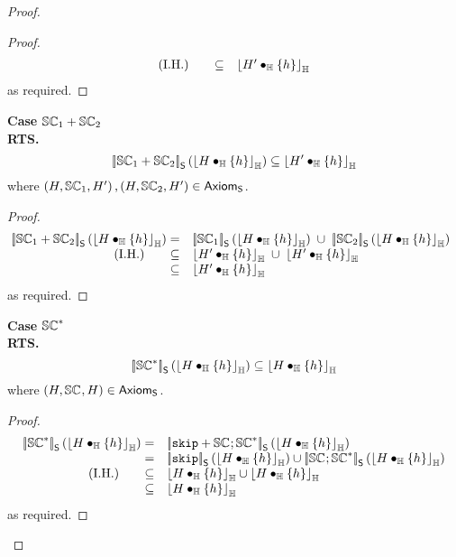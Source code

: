 \begin{lemma}
\begin{proof}
\begin{proof}
\[\begin{array}{r l}
	\text{(I.H.) \hspace*{0.5cm}}
	\subseteq &
	\left\lfloor H' \bullet_{\mathbb{H}} \{h\} \right\rfloor_{\mathbb{H}}
	
\end{array}
\]
%
as required.
\renewcommand{\qed}{}
\end{proof}
%
%

\noindent\textbf{Case \hspace*{0.3cm}}$\mathbb{SC}_{1} + \mathbb{SC}_{2}$\\
\textbf{RTS.}
%
\[
	\left[\!\left| \mathbb{SC}_{1} + \mathbb{SC}_{2} \right |\! \right]_{\textsf{S}}\left( \left\lfloor H \bullet_{\mathbb{H}} \{h\} \right\rfloor_{\mathbb{H}} \right) 
	\subseteq \left\lfloor H' \bullet_{\mathbb{H}} \{h\} \right\rfloor_{\mathbb{H}}
\]
%
where $\left(H, \mathbb{SC}_{1}, H' \right), \left(H, \mathbb{SC}_{2}, H' \right)  \in \textsf{Axiom}_{\textsf{S}}$.
\begin{proof}
%
\[
\hspace*{-0.2cm}
\begin{array}{r l}
	
	\opSemSeq{\seq{1} + \seq{2}}{\reifyH{H \composeH \{h\}}} 
	= &  
	\opSemSeq{\seq{1}}{\reifyH{H \composeH \{h\}}} \;\cup\; \opSemSeq{\seq{2}}{\reifyH{H \composeH \{h\}}}\\

	\text{(I.H.) \hspace*{0.5cm}}
	\subseteq &
	\reifyH{H' \composeH \{h\}} \;\cup\; \reifyH{H' \composeH \{h\}}\\
	
	\subseteq &
	\reifyH{H' \composeH \{h\}}
	
\end{array}
\]
%
as required.
\renewcommand{\qed}{}
\end{proof}
%
%

\noindent\textbf{Case \hspace*{0.3cm}}$\mathbb{SC}_{}^{*}$\\
\textbf{RTS.}
%
\[
	\left[\!\left| \mathbb{SC}_{}^{*} \right |\! \right]_{\textsf{S}}\left( \left\lfloor H \bullet_{\mathbb{H}} \{h\} \right\rfloor_{\mathbb{H}} \right) 
	\subseteq \left\lfloor H \bullet_{\mathbb{H}} \{h\} \right\rfloor_{\mathbb{H}}
\]
%
where $\left(H, \mathbb{SC}_{}, H \right)  \in \textsf{Axiom}_{\textsf{S}}$.
\begin{proof}
%
\[
\begin{array}{r l}
	
	\opSemSeq{\seq{}^{*}}{\reifyH{H \composeH \{h\}}} 
	= &  
	\opSemSeq{\skipC + \seq{}; \seq{}^{*}}{\reifyH{H \composeH \{h\}}} \\
	
	= & \opSemSeq{\skipC}{\reifyH{H \composeH \{h\}}} 
		\cup \opSemSeq{\seq{}; \seq{}^{*}}{\reifyH{H \composeH \{h\}}} \\

	\text{(I.H.) \hspace*{0.5cm}}
	\subseteq &
	\reifyH{H \composeH \{h\}} \cup \reifyH{H \composeH \{h\}}\\
	
	\subseteq &
	\reifyH{H \composeH \{h\}}
	
\end{array}
\]
%
as required.
\renewcommand{\qed}{}
\end{proof}
%
%
\end{proof}
\end{lemma}
